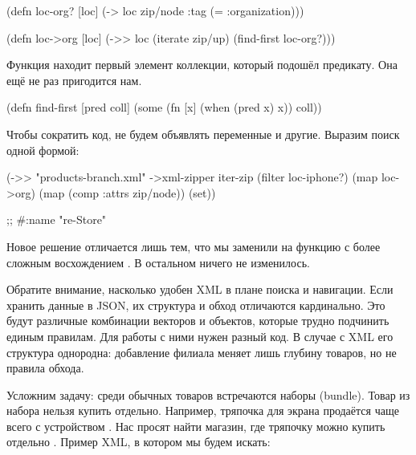 \begin{english}
  \begin{clojure}
(defn loc-org? [loc]
  (-> loc zip/node :tag (= :organization)))

(defn loc->org [loc]
  (->> loc
       (iterate zip/up)
       (find-first loc-org?)))
  \end{clojure}
\end{english}

Функция  находит первый элемент коллекции, который подошёл
предикату. Она ещё не раз пригодится нам.

\begin{english}
  \begin{clojure}
(defn find-first [pred coll]
  (some (fn [x]
          (when (pred x)
            x))
        coll))
  \end{clojure}
\end{english}

Чтобы сократить код, не будем объявлять переменные  и
другие. Выразим поиск одной формой:

\begin{english}
  \begin{clojure/lines}
(->> "products-branch.xml"
     ->xml-zipper
     iter-zip
     (filter loc-iphone?)
     (map loc->org)
     (map (comp :attrs zip/node))
     (set))

;; #{{:name "re-Store"}}
  \end{clojure/lines}
\end{english}

Новое решение отличается лишь тем, что мы заменили  на функцию с более
сложным восхождением . В остальном ничего не изменилось.


Обратите внимание, насколько удобен XML в плане поиска и навигации. Если хранить
данные в JSON, их структура и обход отличаются кардинально. Это будут различные
комбинации векторов и объектов, которые трудно подчинить единым правилам. Для
работы с ними нужен разный код. В случае с XML его структура однородна:
добавление филиала меняет лишь глубину товаров, но не правила обхода.

Усложним задачу: среди обычных товаров встречаются наборы (bundle). Товар из
набора нельзя купить отдельно. Например, тряпочка для экрана продаётся чаще
всего с устройством . Нас просят найти магазин, где тряпочку можно
купить отдельно . Пример XML, в котором мы будем искать:

